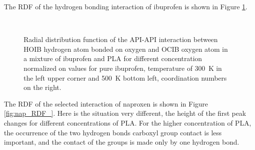 The RDF of the hydrogen bonding interaction of ibuprofen is shown in Figure \ref{fig:ibu_s_RDF_}.

\begin{figure}[htb!]
	\centering
	\\
	\caption{Radial distribution function of the API-API interaction between HOIB hydrogen atom bonded on oxygen and OCIB oxygen atom in a mixture of ibuprofen and PLA for different concentration normalized on values for pure ibuprofen, temperature of 300~K in the left upper corner and 500~K bottom left, coordination numbers on the right.}
	\label{fig:ibu_s_RDF_}
\end{figure}

The RDF of the selected interaction of naproxen is shown in Figure \ref{fig:nap_RDF_}. Here is the situation very different, the height of the first peak changes for different concentrations of PLA. For the higher concentration of PLA, the occurrence of the two hydrogen bonds carboxyl group contact is less important, and the contact of the groups is made only by one hydrogen bond.

